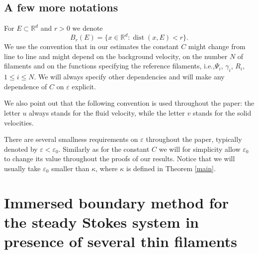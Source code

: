 \documentclass[11pt]{article}
\newcommand{\ie}{i.e.,\xspace}
\newcommand{\R}{\mathbb{R}}
\let\eps\varepsilon
\DeclareMathOperator{\dist}{dist}
\theoremstyle{definition}
\theoremstyle{remark}
\begin{document}
\subsection{A few more notations}
For $E \subset \R^d$ and $r>0$ we denote
\begin{equation}
B_r(E) = \{ x \in \R^d : \dist(x,E) < r \}.
\end{equation}
We use the convention that in our estimates the constant $C$ might change from line to line and might depend on the background velocity, on the number $N$ of filaments and on the functions specifying the reference filaments, \ie $\Psi_i$, $\gamma_i$, $R_i$, $1 \leq i \leq N$.
We will always specify other dependencies and will make any dependence of $C$ on $\eps$ explicit.

We also point out that the following convention is used throughout the paper: the letter $u$ always stands for the fluid velocity, while the letter $v$ stands for the solid velocities.

There are several smallness requirements on $\eps$ throughout the paper, typically denoted by $\eps < \eps_0$. Similarly as for the constant $C$ we will for simplicity
allow $\eps_0$ to change its value throughout the proofs of our results. Notice that we will usually take $\eps_0$ smaller than $\kappa$, where $\kappa$ is defined in Theorem \ref{main}.

\section{Immersed boundary method for the steady Stokes system in presence of several thin filaments}
\label{sec:singularity.method}
\end{document}
